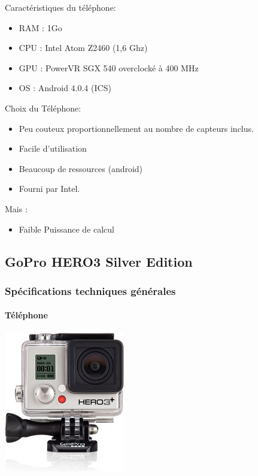 \documentclass[transparent]{beamer}
\begin{document}
\begin{frame} 
	\begin{block}{Caractéristiques du téléphone:}
			\begin{itemize}
				\item RAM : 1Go
				\item CPU : Intel Atom Z2460 (1,6 Ghz)
				\item GPU : PowerVR SGX 540 overclocké à 400 MHz
				\item OS : Android 4.0.4 (ICS)
			\end{itemize}
	\end{block}
	\begin{block}{Choix du Téléphone:}
			\begin{itemize}
				\item Peu couteux proportionnellement au nombre de capteurs inclus.
				\item Facile d'utilisation
				\item Beaucoup de ressources (android)
				\item Fourni par Intel.
			\end{itemize}
	\end{block}
	\begin{block}{Mais :}
			\begin{itemize}
				\item Faible Puissance de calcul
			\end{itemize}
	\end{block}

\end{frame}

\subsection{GoPro HERO3 Silver Edition}
\begin{frame}
	\frametitle{Spécifications techniques générales}
	\framesubtitle{Téléphone}
	\begin{center}
 	\includegraphics[height=0.8\textheight]{images/gopro.jpg} 
	\end{center}

\end{frame}
\end{document}
